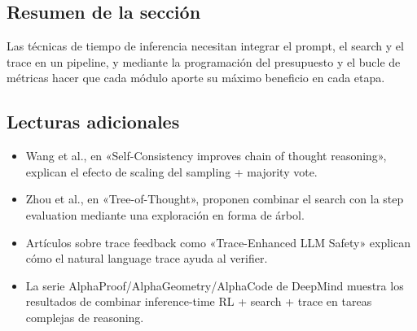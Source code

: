 \subsection{Resumen de la sección}
Las técnicas de tiempo de inferencia necesitan integrar el prompt, el search y el trace en un pipeline, y mediante la programación del presupuesto y el bucle de métricas hacer que cada módulo aporte su máximo beneficio en cada etapa.

\subsection{Lecturas adicionales}
\begin{itemize}
\item Wang et al., en «Self-Consistency improves chain of thought reasoning», explican el efecto de scaling del sampling + majority vote.
\item Zhou et al., en «Tree-of-Thought», proponen combinar el search con la step evaluation mediante una exploración en forma de árbol.
\item Artículos sobre trace feedback como «Trace-Enhanced LLM Safety» explican cómo el natural language trace ayuda al verifier.
\item La serie AlphaProof/AlphaGeometry/AlphaCode de DeepMind muestra los resultados de combinar inference-time RL + search + trace en tareas complejas de reasoning.
\end{itemize}


